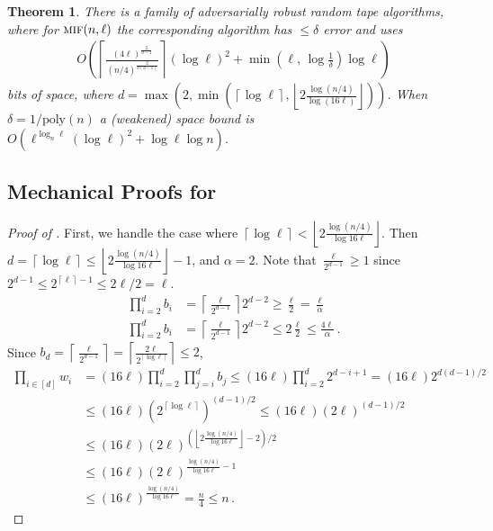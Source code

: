\documentclass[10pt,a4paper]{article}
\newtheorem{theorem}{Theorem}[section]
\theoremstyle{definition}
\theoremstyle{remark}
\newcommand{\ceil}[1]{{\left\lceil{#1}\right\rceil}}
\newcommand{\floor}[1]{{\left\lfloor{#1}\right\rfloor}}
\newcommand{\mif}{\textsc{mif}\xspace}
\newcommand{\poly}{\mathrm{poly}\xspace}
\newcommand{\rl}{\mathbf{\ell}}             %
\begin{document}
\begin{itemize}
\begin{itemize}
\begin{theorem} %
\label{thm:rt-ub-intro}
  There is a family of adversarially robust random tape algorithms, where
  for $\mif(n,\rl)$ the corresponding algorithm has $\le \delta$ error and uses
  \begin{align*}
    O\left(\ceil{ 
    \frac{(4 \rl)^{\frac{2}{d - 1}}}{(n/4)^{\frac{2}{d(d-1)}}}
    } (\log \rl)^2 + \min(\rl,\, \log \tfrac{1}{\delta}) \log \rl \right)
  \end{align*}
  bits of space, where $d = \max\left(2, \min\left(\ceil{\log \rl}, \floor{2 \frac{\log(n/4)}{\log(16\rl)}}\right)\right)$. When $\delta = 1/\poly(n)$ a (weakened) space bound is $O\left(\rl^{\log_n \rl} (\log \rl)^2 + \log \rl\log n\right)$.
\end{theorem}

\subsection{Mechanical Proofs for \texorpdfstring{}{Random Tape Upper Bound}}\label{subsec:rt-ub-mech}

\begin{proof}[Proof of ]
  First, we handle the case where $\ceil{\log \rl} <  \floor{2 \frac{\log(n/4)}{\log 16 \rl}}$. Then $d = \ceil{\log \rl} \le \floor{2 \frac{\log(n/4)}{\log 16 \rl}} - 1$, and $\alpha = 2$. Note that $\frac{\rl}{2^{d - 1}} \ge 1$ since $2^{d - 1} \le  2^{\ceil{\rl} - 1} \le 2\rl/2 = \rl$.
  \begin{align*}
      \prod_{i=2}^{d} b_i &= \ceil{\frac{\rl}{2^{d - 1}}} 2^{d - 2} \ge \frac{\rl}{2} = \frac{\rl}{\alpha} \\
      \prod_{i=2}^{d} b_i &=  \ceil{\frac{\rl}{2^{d - 1}}} 2^{d - 2} \le 2 \frac{\rl}{2} \le \frac{4 \rl}{\alpha} \,.
  \end{align*}
  Since $b_d = \ceil{\frac{\rl}{2^{d - 1}}} = \ceil{\frac{2 \rl}{2^{\ceil{\log \rl}}}} \le 2$,
  \begin{align*}
    \prod_{i \in [d]} w_i &= (16 \rl) \prod_{i = 2}^{d} \prod_{j=i}^{d} b_j
      \le (16 \rl) \prod_{i = 2}^{d} 2^{d - i + 1} = (16 \rl) 2^{d (d-1) / 2} \\
      &\le (16 \rl) (2^{\ceil{\log \rl}})^{(d-1) / 2} \le (16 \rl) (2 \rl)^{(d-1) / 2} \\
      &\le (16 \rl) (2 \rl)^{(\floor{2 \frac{\log (n/4)}{\log 16\rl}}-2) / 2} \\
      &\le (16 \rl) (2 \rl)^{\frac{\log (n/4)}{\log 16\rl} - 1} \\
      &\le (16 \rl)^{\frac{\log (n/4)}{\log 16\rl}} = \frac{n}{4} \le n \,.
  \end{align*}


\end{proof}
\end{itemize}
\end{itemize}
\end{document}
